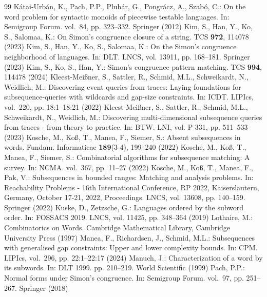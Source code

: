 \documentclass[10pt,a4paper]{amsart}
\theoremstyle{plain}
\theoremstyle{definition}
\begin{document}
\begin{thebibliography}{99}
 K{\'a}tai-Urb{\'a}n, K., Pach, P.P., Pluh{\'a}r, G., Pongr{\'a}cz, A., Szab{\'o}, C.: On the word problem for syntactic monoids of piecewise testable languages. In: Semigroup Forum. vol.~84, pp. 323--332. Springer (2012)
 Kim, S., Han, Y., Ko, S., Salomaa, K.: On {S}imon's congruence closure of a string. TCS \textbf{972}, 114078 (2023)
 Kim, S., Han, Y., Ko, S., Salomaa, K.: On the {S}imon's congruence neighborhood of languages. In: DLT. LNCS, vol. 13911, pp. 168--181. Springer (2023)
 Kim, S., Ko, S., Han, Y.: Simon's congruence pattern matching. TCS \textbf{994}, 114478 (2024)
 Kleest{-}Mei{\ss}ner, S., Sattler, R., Schmid, M.L., Schweikardt, N., Weidlich, M.: Discovering event queries from traces: Laying foundations for subsequence-queries with wildcards and gap-size constraints. In: {ICDT}. LIPIcs, vol.~220, pp. 18:1--18:21 (2022)
 Kleest{-}Mei{\ss}ner, S., Sattler, R., Schmid, M.L., Schweikardt, N., Weidlich, M.: Discovering multi-dimensional subsequence queries from traces - from theory to practice. In: {BTW}. {LNI}, vol. {P-331}, pp. 511--533 (2023)
 Kosche, M., Ko{\ss}, T., Manea, F., Siemer, S.: Absent subsequences in words. Fundam. Informaticae \textbf{189}(3-4), 199--240 (2022)
 Kosche, M., Ko{\ss}, T., Manea, F., Siemer, S.: Combinatorial algorithms for subsequence matching: A survey. In: NCMA. vol.~367, pp. 11--27 (2022)
 Kosche, M., Ko{\ss}, T., Manea, F., Pak, V.: Subsequences in bounded ranges: Matching and analysis problems. In: Reachability Problems - 16th International Conference, {RP} 2022, Kaiserslautern, Germany, October 17-21, 2022, Proceedings. LNCS, vol. 13608, pp. 140--159. Springer (2022)
 Kuske, D., Zetzsche, G.: Languages ordered by the subword order. In: {FOSSACS} 2019. LNCS, vol. 11425, pp. 348--364 (2019)
 Lothaire, M.: Combinatorics on Words. Cambridge Mathematical Library, Cambridge University Press (1997)
 Manea, F., Richardsen, J., Schmid, M.L.: Subsequences with generalised gap constraints: Upper and lower complexity bounds. In: {CPM}. LIPIcs, vol.~296, pp. 22:1--22:17 (2024)
 Manuch, J.: Characterization of a word by its subwords. In: DLT 1999. pp. 210--219. World Scientific (1999)
 Pach, P.P.: Normal forms under {S}imon's congruence. In: Semigroup Forum. vol.~97, pp. 251--267. Springer (2018)

\end{thebibliography}
\end{document}
